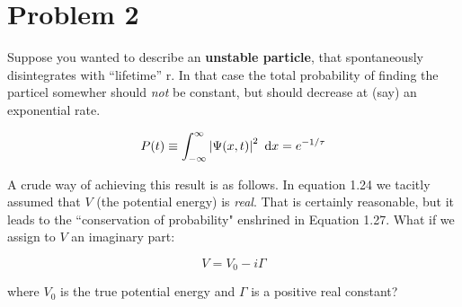 \documentclass[10pt]{article}
\begin{document}
    \section*{Problem 2}

    Suppose you wanted to describe an \textbf{unstable particle}, that spontaneously disintegrates with ``lifetime'' r. In that case the total probability of finding the particel somewher should \textit{not} be constant, but should decrease at (say) an exponential rate. 

    \[ P(t) \equiv \int_{-\infty}^{\infty} \left| \Psi(x, t)\right|^2 \ \mathrm d x = e^{-1/\tau}\]

    A crude way of achieving this result is as follows. In equation 1.24 we tacitly assumed that $V$ (the potential energy) is \textit{real}. That is certainly reasonable, but it leads to the ``conservation of probability" enshrined in Equation 1.27. What if we assign to $V$ an imaginary part: 

    \[ V = V_0 - i\Gamma\] 

    where $V_0$ is the true potential energy and $\Gamma$ is a positive real constant?
\end{document}
